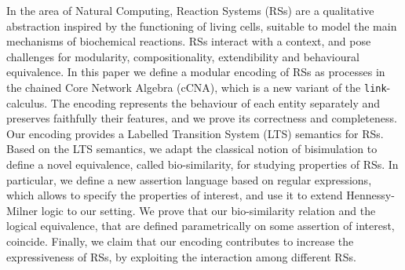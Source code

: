 
In the area of Natural Computing, Reaction Systems (RSs) are
a qualitative abstraction inspired by the 
functioning of living cells, suitable to model the main
mechanisms of biochemical reactions.
RSs interact with a context, and
pose challenges for modularity, compositionality, extendibility and behavioural equivalence. 
In this paper we define a modular encoding of RSs as processes
in the chained Core Network Algebra (cCNA), which is a new variant  of the  {\tt link}-calculus.
The encoding represents the behaviour of each entity separately and
preserves faithfully their features, and we prove its correctness and completeness.
Our encoding provides a Labelled Transition System (LTS) semantics for RSs. Based on the LTS semantics, we adapt  the classical notion of  bisimulation to define a novel equivalence, called bio-similarity, for studying properties of RSs.
In particular, we define a new assertion language based on regular expressions, 
which allows to specify the properties of interest, and use it to extend Hennessy-Milner logic
to our setting.
We prove that our bio-similarity relation and the logical equivalence, that are defined parametrically on some assertion of interest, coincide.
Finally, 
we claim that
our encoding 
contributes to increase the expressiveness
of RSs, by exploiting the interaction among 
different RSs. 
